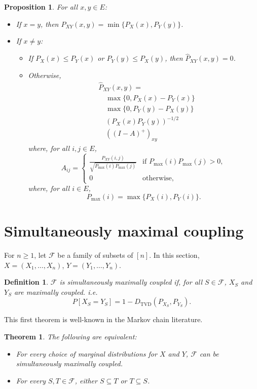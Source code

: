 \documentclass{article}
\newtheorem{theorem}{Theorem}
\newtheorem{proposition}{Proposition}
\newtheorem{definition}{Definition}
\newcommand{\F}{\mathcal{F}}
\begin{document}
\begin{proposition}
    For all $x, y \in E$:
    \begin{itemize}
        \item If $x = y$, then $\hat{P}_{XY}(x,y) = \min \{ P_X(x), P_Y(y) \}$.
        \item If $x \neq y$:
        \begin{itemize}
            \item If $P_X(x) \leq P_Y(x)$ or $P_Y(y) \leq P_X(y)$, then $\hat{P}_{XY}(x,y) = 0$.
            \item Otherwise,
\begin{align*}
&\hat{P}_{XY}(x,y) = \\
&\quad\max \{ 0, P_X(x) - P_Y(x) \} \\
&\quad\max \{ 0, P_Y(y) - P_X(y) \} \\
&\quad\left( P_X(x) P_Y(y) \right)^{-1/2} \\
&\quad\left( (I - A)^+ \right)_{xy}
\end{align*}
                where, for all $i,j \in E$,
\[
A_{ij} =
\begin{cases}
    \frac{P_{XY}(i,j)}{\sqrt{P_{\text{max}}(i) P_{\text{max}}(j)}} & \text{if } P_{\text{max}}(i) P_{\text{max}}(j) > 0, \\
    0 & \text{otherwise},
\end{cases}
\]
                where, for all $i \in E$,
\[
P_{\text{max}}(i) = \max \{ P_X(i), P_Y(i) \}.
\]
        \end{itemize}
    \end{itemize}
\end{proposition}

\section*{Simultaneously maximal coupling}

For $n \ge 1$, let \( \mathcal{F} \) be a family of subsets of \([n]\).
In this section, \( X = (X_1, \dots, X_n) \), \( Y = (Y_1, \dots, Y_n) \).

\begin{definition}
$\F$ is simultaneously maximally coupled if, for all $S \in \F$,
$X_S$ and $Y_S$ are maximally coupled. i.e.
\[
    P[X_S = Y_S] = 1 - D_{\text{TVD}}(P_{X_S}, P_{Y_S}).
\]
\end{definition}

This first theorem is well-known in the Markov chain literature.

\begin{theorem}
The following are equivalent:
\begin{itemize}
    \item For every choice of marginal distributions for $X$ and $Y$,
    $\F$ can be simultaneously maximally coupled.
    \item For every $S,T \in \F$, either $S \subseteq T$ or $T \subseteq S$.
\end{itemize}
\end{theorem}
\end{document}
